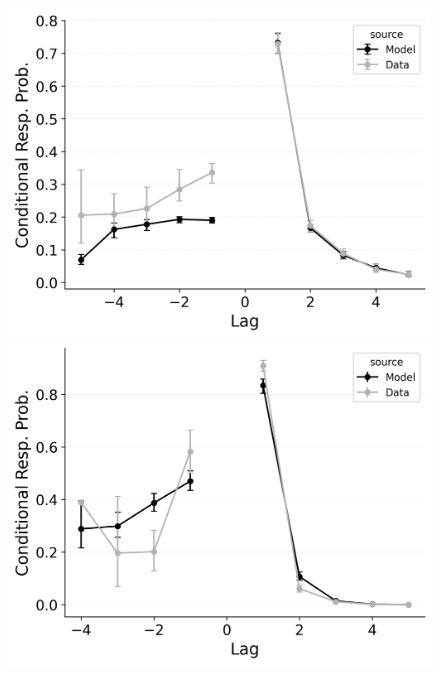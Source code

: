 \documentclass[
  man,
  floatsintext,
  longtable,
  nolmodern,
  notxfonts,
  notimes,
  draftfirst,
  colorlinks=true,linkcolor=blue,citecolor=blue,urlcolor=blue]{apa7}
\begin{document}
\begin{figure}
%
\begin{minipage}{0.33\linewidth}
\includegraphics{figures/bw_Gordon2021_BaseCRU_Confusable_Fitting_crp_LL7.png}\end{minipage}%
\newline
\begin{minipage}{0.33\linewidth}
\includegraphics{figures/bw_Gordon2021_CRU_with_Pre-Expt_and_Primacy_Confusable_Fitting_crp_LL5.png}\end{minipage}%
%
\begin{minipage}{0.33\linewidth}

\end{minipage}
\end{figure}
\end{document}
